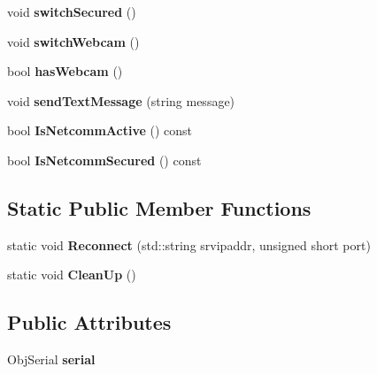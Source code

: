 \begin{DoxyCompactItemize}
\item 
void {\bfseries switch\+Secured} ()\hypertarget{classNetClient_a1b7b4bf02a673febd12666c8ceb0a4e3}{}\label{classNetClient_a1b7b4bf02a673febd12666c8ceb0a4e3}

\item 
void {\bfseries switch\+Webcam} ()\hypertarget{classNetClient_a3669388de7794fcfddc3df4522d118a0}{}\label{classNetClient_a3669388de7794fcfddc3df4522d118a0}

\item 
bool {\bfseries has\+Webcam} ()\hypertarget{classNetClient_a8cefcba6dcffae5f96cd924f74b40073}{}\label{classNetClient_a8cefcba6dcffae5f96cd924f74b40073}

\item 
void {\bfseries send\+Text\+Message} (string message)\hypertarget{classNetClient_a5a6491c708b25939f2406d92a186b3aa}{}\label{classNetClient_a5a6491c708b25939f2406d92a186b3aa}

\item 
bool {\bfseries Is\+Netcomm\+Active} () const \hypertarget{classNetClient_a28afaf222394bd96cc8062e6a3464e84}{}\label{classNetClient_a28afaf222394bd96cc8062e6a3464e84}

\item 
bool {\bfseries Is\+Netcomm\+Secured} () const \hypertarget{classNetClient_ab4f313115f6d8d927cb4dffafc116c5a}{}\label{classNetClient_ab4f313115f6d8d927cb4dffafc116c5a}

\end{DoxyCompactItemize}
\subsection*{Static Public Member Functions}
\begin{DoxyCompactItemize}
\item 
static void {\bfseries Reconnect} (std\+::string srvipaddr, unsigned short port)\hypertarget{classNetClient_a340e0ab03a04587e661e089a9e443521}{}\label{classNetClient_a340e0ab03a04587e661e089a9e443521}

\item 
static void {\bfseries Clean\+Up} ()\hypertarget{classNetClient_ab277f32974266ce1b3c87ae8bf62197b}{}\label{classNetClient_ab277f32974266ce1b3c87ae8bf62197b}

\end{DoxyCompactItemize}
\subsection*{Public Attributes}
\begin{DoxyCompactItemize}
\item 
Obj\+Serial {\bfseries serial}\hypertarget{classNetClient_a0c70ee929447bc646408ab48ae1fac6b}{}\label{classNetClient_a0c70ee929447bc646408ab48ae1fac6b}

\end{DoxyCompactItemize}


